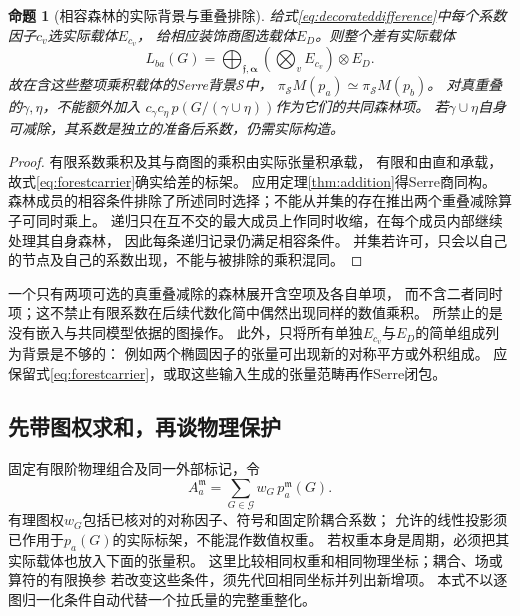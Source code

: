 \documentclass[11pt,a4paper]{ctexart}
\theoremstyle{cnplain}\newtheorem{theorem}{定理}[section]
\newtheorem{proposition}[theorem]{命题}
\theoremstyle{definition}\newtheorem{definition}[theorem]{定义}
\theoremstyle{remark}\newtheorem{remark}[theorem]{注}
\begin{document}
\begin{proposition}[相容森林的实际背景与重叠排除]\label{prop:forestcarrier}
给式\eqref{eq:decorateddifference}中每个系数因子$c_v$选实际载体$E_{c_v}$，
给相应装饰商图选载体$E_D$。则整个差有实际载体
\begin{equation}\label{eq:forestcarrier}
 L_{ba}(G)=
 \bigoplus_{\mathfrak f,\boldsymbol\alpha}
 \left(\bigotimes_{v}E_{c_v}\right)\otimes E_D.
\end{equation}
故在含这些\emph{整项乘积载体}的Serre背景$\mathcal S$中，
$\pi_\mathcal S M(p_a)\simeq\pi_\mathcal S M(p_b)$。
对真重叠的$\gamma,\eta$，不能额外加入
$c_\gamma c_\eta\,p(G/(\gamma\cup\eta))$作为它们的共同森林项。
若$\gamma\cup\eta$自身可减除，其系数是独立的准备后系数，仍需实际构造。
\end{proposition}
\begin{proof}
有限系数乘积及其与商图的乘积由实际张量积承载，
有限和由直和承载，故式\eqref{eq:forestcarrier}确实给差的标架。
应用定理\ref{thm:addition}得Serre商同构。
森林成员的相容条件排除了所述同时选择；不能从并集的存在推出两个重叠减除算子可同时乘上。
递归只在互不交的最大成员上作同时收缩，在每个成员内部继续处理其自身森林，
因此每条递归记录仍满足相容条件。
并集若许可，只会以自己的节点及自己的系数出现，不能与被排除的乘积混同。
\end{proof}

一个只有两项可选的真重叠减除的森林展开含空项及各自单项，
而不含二者同时项；这不禁止有限系数在后续代数化简中偶然出现同样的数值乘积。
所禁止的是没有嵌入与共同模型依据的图操作。
此外，只将所有单独$E_{c_v}$与$E_D$的简单组成列为背景是不够的：
例如两个椭圆因子的张量可出现新的对称平方或外积组成。
应保留式\eqref{eq:forestcarrier}，或取这些输入生成的张量范畴再作Serre闭包。

\subsection{先带图权求和，再谈物理保护}

固定有限阶物理组合及同一外部标记，令
\begin{equation}\label{eq:weightedobservable}
 A_a^{\mathfrak m}=\sum_{G\in\mathcal G}w_G\,p_a^{\mathfrak m}(G).
\end{equation}
有理图权$w_G$包括已核对的对称因子、符号和固定阶耦合系数；
允许的线性投影须已作用于$p_a(G)$的实际标架，不能混作数值权重。
若权重本身是周期，必须把其实际载体也放入下面的张量积。
这里比较相同权重和相同物理坐标；耦合、场或算符的有限换参
若改变这些条件，须先代回相同坐标并列出新增项。
本式不以逐图归一化条件自动代替一个拉氏量的完整重整化。
\end{document}
